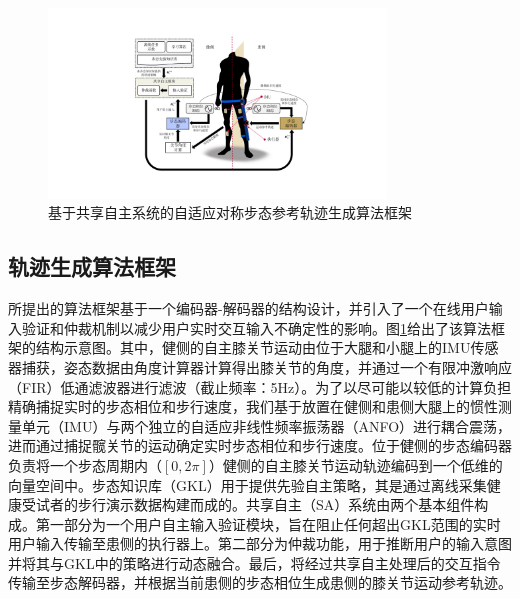 \begin{figure}[!t]
  \centering\includegraphics[width=0.8\textwidth]{figures/5-Fig-2.pdf}
  \caption{基于共享自主系统的自适应对称步态参考轨迹生成算法框架}
  \label{fig:5-2}
\end{figure}

\subsection{轨迹生成算法框架}
所提出的算法框架基于一个编码器-解码器的结构设计，并引入了一个在线用户输入验证和仲裁机制以减少用户实时交互输入不确定性的影响。图\ref{fig:5-2}给出了该算法框架的结构示意图。其中，健侧的自主膝关节运动由位于大腿和小腿上的IMU传感器捕获，姿态数据由角度计算器计算得出膝关节的角度，并通过一个有限冲激响应（FIR）低通滤波器进行滤波（截止频率：5Hz）。为了以尽可能以较低的计算负担精确捕捉实时的步态相位和步行速度，我们基于放置在健侧和患侧大腿上的惯性测量单元（IMU）与两个独立的自适应非线性频率振荡器（ANFO）进行耦合震荡，进而通过捕捉髋关节的运动确定实时步态相位和步行速度。位于健侧的步态编码器负责将一个步态周期内（$[0,2\pi ]$）健侧的自主膝关节运动轨迹编码到一个低维的向量空间中。步态知识库（GKL）用于提供先验自主策略，其是通过离线采集健康受试者的步行演示数据构建而成的。共享自主（SA）系统由两个基本组件构成。第一部分为一个用户自主输入验证模块，旨在阻止任何超出GKL范围的实时用户输入传输至患侧的执行器上。第二部分为仲裁功能，用于推断用户的输入意图并将其与GKL中的策略进行动态融合。最后，将经过共享自主处理后的交互指令传输至步态解码器，并根据当前患侧的步态相位生成患侧的膝关节运动参考轨迹。



